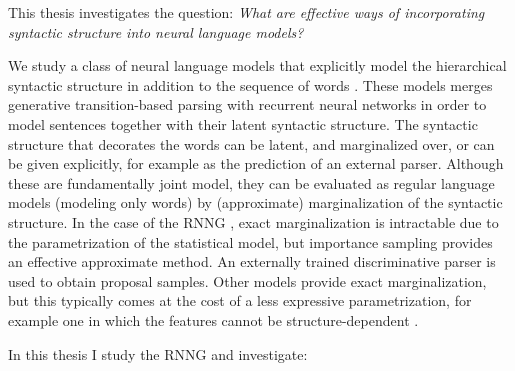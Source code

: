 % 

This thesis investigates the question: \textit{What are effective ways of incorporating syntactic structure into neural language models?}

We study a class of neural language models that explicitly model the hierarchical syntactic structure in addition to the sequence of words \citep{Dyer+2016:RNNG,Buys+2015:neural-gen-dep,Buys+2018}. These models merges generative transition-based parsing with recurrent neural networks in order to model sentences together with their latent syntactic structure. The syntactic structure that decorates the words can be latent, and marginalized over, or can be given explicitly, for example as the prediction of an external parser. Although these are fundamentally joint model, they can be evaluated as regular language models (modeling only words) by (approximate) marginalization of the syntactic structure. In the case of the RNNG \citep{Dyer+2016:RNNG}, exact marginalization is intractable due to the parametrization of the statistical model, but importance sampling provides an effective approximate method. An externally trained discriminative parser is used to obtain proposal samples. Other models provide exact marginalization, but this typically comes at the cost of a less expressive parametrization, for example one in which the features cannot be structure-dependent \citep{Buys+2018}.

In this thesis I study the RNNG \citep{Dyer+2016:RNNG} and investigate:


